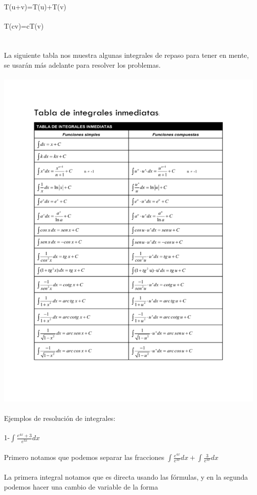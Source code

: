 \documentclass[a4paper,10pt]{article}
\begin{document}
T(u+v)=T(u)+T(v)\\\\
T(cv)=cT(v)\\\\\\
La siguiente tabla nos muestra algunas integrales de repaso para tener en mente, se usarán más adelante para resolver los problemas.\\\\
\includegraphics[scale=.6]{integrales.png}\\\\
Ejemplos de resolución de integrales:\\\\
1-$\int \frac{e^{4x}+3}{e^{3x}} dx $\\\\
Primero notamos que podemos separar las fracciones $\int \frac{e^{4x}}{e^{3x}} dx + \int \frac{3}{e^{3x}} dx$\\\\
La primera integral notamos que es directa usando las fórmulas, y en la segunda podemos hacer una cambio de variable de la forma\\\\
\end{document}
